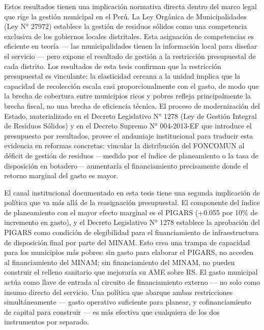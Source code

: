 Estos resultados tienen una implicación normativa directa dentro del marco legal que rige la gestión municipal en el Perú. La Ley Orgánica de Municipalidades (Ley N° 27972) establece la gestión de residuos sólidos como una competencia exclusiva de los gobiernos locales distritales. Esta asignación de competencias es eficiente en teoría --- las municipalidades tienen la información local para diseñar el servicio --- pero expone el resultado de gestión a la restricción presupuestal de cada distrito. Los resultados de esta tesis confirman que la restricción presupuestal es vinculante: la elasticidad cercana a la unidad implica que la capacidad de recolección escala casi proporcionalmente con el gasto, de modo que la brecha de cobertura entre municipios ricos y pobres refleja principalmente la brecha fiscal, no una brecha de eficiencia técnica. El proceso de modernización del Estado, materializado en el Decreto Legislativo N° 1278 (Ley de Gestión Integral de Residuos Sólidos) y en el Decreto Supremo N° 004-2013-EF que introduce el presupuesto por resultados, provee el andamiaje institucional para traducir esta evidencia en reformas concretas: vincular la distribución del FONCOMUN al déficit de gestión de residuos ---medido por el índice de planeamiento o la tasa de disposición en botadero--- aumentaría el financiamiento precisamente donde el retorno marginal del gasto es mayor.

El canal institucional documentado en esta tesis tiene una segunda implicación de política que va más allá de la reasignación presupuestal. El componente del índice de planeamiento con el mayor efecto marginal es el PIGARS (+0.055 por 10\% de incremento en gasto), y el Decreto Legislativo N° 1278 establece la aprobación del PIGARS como condición de elegibilidad para el financiamiento de infraestructura de disposición final por parte del MINAM. Esto crea una trampa de capacidad para los municipios más pobres: sin gasto para elaborar el PIGARS, no acceden al financiamiento del MINAM; sin financiamiento del MINAM, no pueden construir el relleno sanitario que mejoraría su AME sobre RS. El gasto municipal actúa como llave de entrada al circuito de financiamiento externo --- no solo como insumo directo del servicio. Una política que abarque ambas restricciones simultáneamente --- gasto operativo suficiente para planear, y cofinanciamiento de capital para construir --- es más efectiva que cualquiera de los dos instrumentos por separado.

